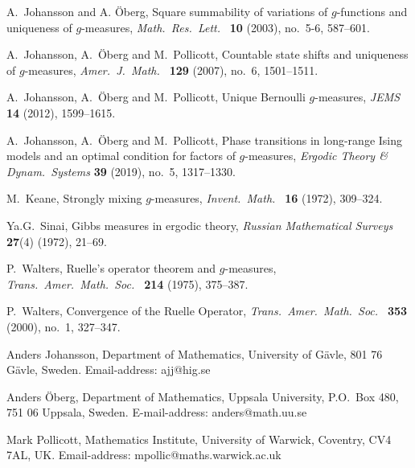 \documentclass[11pt, a4paper]{amsart}
\theoremstyle{definition}
\theoremstyle{remark}
\begin{document}
\begin{thebibliography}{999}
 A.\ Johansson and A. \"Oberg, Square summability of
  variations of $g$-functions and uniqueness of $g$-measures, {\em
    Math.\ Res.\ Lett.\ } {\bf 10} (2003), no.\ 5-6, 587--601.
    
 A.\ Johansson, A.\ \"Oberg and M.\ Pollicott,
  Countable state shifts and uniqueness of $g$-measures, {\em Amer.\
    J.\ Math.\ } {\bf 129} (2007), no.\ 6, 1501--1511.

 A.\ Johansson, A.\ \"Oberg and M.\ Pollicott, 
Unique Bernoulli $g$-measures, {\em JEMS} {\bf 14} (2012), 1599--1615.

 A.\ Johansson, A.\ \"Oberg and M.\ Pollicott, 
Phase transitions in long-range Ising models and an optimal 
condition for factors of $g$-measures, {\em Ergodic Theory \& Dynam.\ Systems}
{\bf 39} (2019), no.\ 5, 1317--1330.

  
 M.\ Keane, Strongly mixing $g$-measures, {\em Invent.\
    Math.\ } {\bf 16} (1972), 309--324.

Ya.G.\ Sinai, Gibbs measures in ergodic theory, {\em Russian Mathematical Surveys} {\bf 27}(4) (1972), 21--69. 

\bibitem{walters1}
P.\ Walters, Ruelle's operator theorem and $g$-measures, {\em Trans.\ Amer.\ Math.\ Soc.\ } {\bf 214} (1975), 375--387.

\bibitem{walters3}
P.\ Walters, Convergence of the Ruelle Operator, {\em Trans.\ Amer.\ Math.\ Soc.\ } {\bf 353} (2000), 
no.\ 1, 327--347.
\end{thebibliography}


\noindent
Anders Johansson, Department of Mathematics, University of G\"avle,
801 76 G\"avle, Sweden. Email-address: ajj@hig.se\newline

\noindent
Anders \"Oberg, Department of Mathematics, Uppsala University, P.O.\
Box 480, 751 06 Uppsala, Sweden. E-mail-address:
anders@math.uu.se\newline

\noindent
Mark Pollicott, Mathematics Institute, University of Warwick,
Coventry, CV4 7AL, UK. Email-address: mpollic@maths.warwick.ac.uk
\end{document}
